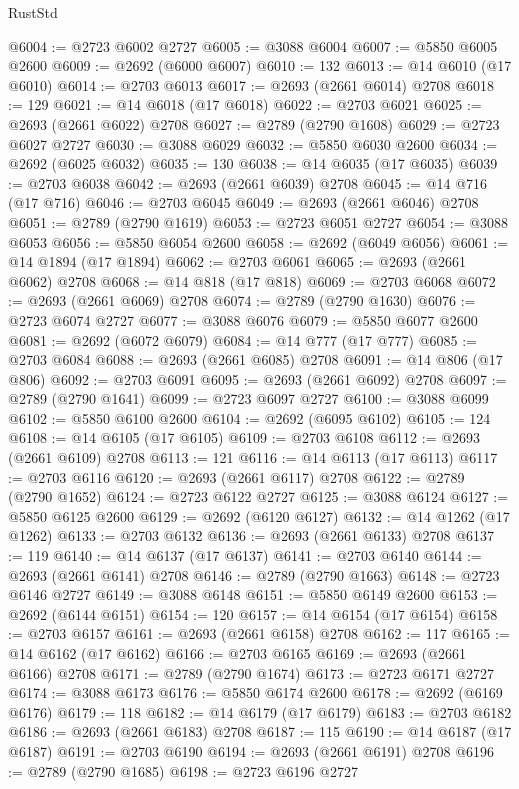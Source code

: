 \begin{lexlean}{RustStd}
\begin{coremodule}
@6004 := @2723 @6002 @2727
@6005 := @3088 @6004
@6007 := @5850 @6005 @2600
@6009 := @2692 (@6000 @6007)
@6010 := 132
@6013 := @14 @6010 (@17 @6010)
@6014 := @2703 @6013
@6017 := @2693 (@2661 @6014) @2708
@6018 := 129
@6021 := @14 @6018 (@17 @6018)
@6022 := @2703 @6021
@6025 := @2693 (@2661 @6022) @2708
@6027 := @2789 (@2790 @1608)
@6029 := @2723 @6027 @2727
@6030 := @3088 @6029
@6032 := @5850 @6030 @2600
@6034 := @2692 (@6025 @6032)
@6035 := 130
@6038 := @14 @6035 (@17 @6035)
@6039 := @2703 @6038
@6042 := @2693 (@2661 @6039) @2708
@6045 := @14 @716 (@17 @716)
@6046 := @2703 @6045
@6049 := @2693 (@2661 @6046) @2708
@6051 := @2789 (@2790 @1619)
@6053 := @2723 @6051 @2727
@6054 := @3088 @6053
@6056 := @5850 @6054 @2600
@6058 := @2692 (@6049 @6056)
@6061 := @14 @1894 (@17 @1894)
@6062 := @2703 @6061
@6065 := @2693 (@2661 @6062) @2708
@6068 := @14 @818 (@17 @818)
@6069 := @2703 @6068
@6072 := @2693 (@2661 @6069) @2708
@6074 := @2789 (@2790 @1630)
@6076 := @2723 @6074 @2727
@6077 := @3088 @6076
@6079 := @5850 @6077 @2600
@6081 := @2692 (@6072 @6079)
@6084 := @14 @777 (@17 @777)
@6085 := @2703 @6084
@6088 := @2693 (@2661 @6085) @2708
@6091 := @14 @806 (@17 @806)
@6092 := @2703 @6091
@6095 := @2693 (@2661 @6092) @2708
@6097 := @2789 (@2790 @1641)
@6099 := @2723 @6097 @2727
@6100 := @3088 @6099
@6102 := @5850 @6100 @2600
@6104 := @2692 (@6095 @6102)
@6105 := 124
@6108 := @14 @6105 (@17 @6105)
@6109 := @2703 @6108
@6112 := @2693 (@2661 @6109) @2708
@6113 := 121
@6116 := @14 @6113 (@17 @6113)
@6117 := @2703 @6116
@6120 := @2693 (@2661 @6117) @2708
@6122 := @2789 (@2790 @1652)
@6124 := @2723 @6122 @2727
@6125 := @3088 @6124
@6127 := @5850 @6125 @2600
@6129 := @2692 (@6120 @6127)
@6132 := @14 @1262 (@17 @1262)
@6133 := @2703 @6132
@6136 := @2693 (@2661 @6133) @2708
@6137 := 119
@6140 := @14 @6137 (@17 @6137)
@6141 := @2703 @6140
@6144 := @2693 (@2661 @6141) @2708
@6146 := @2789 (@2790 @1663)
@6148 := @2723 @6146 @2727
@6149 := @3088 @6148
@6151 := @5850 @6149 @2600
@6153 := @2692 (@6144 @6151)
@6154 := 120
@6157 := @14 @6154 (@17 @6154)
@6158 := @2703 @6157
@6161 := @2693 (@2661 @6158) @2708
@6162 := 117
@6165 := @14 @6162 (@17 @6162)
@6166 := @2703 @6165
@6169 := @2693 (@2661 @6166) @2708
@6171 := @2789 (@2790 @1674)
@6173 := @2723 @6171 @2727
@6174 := @3088 @6173
@6176 := @5850 @6174 @2600
@6178 := @2692 (@6169 @6176)
@6179 := 118
@6182 := @14 @6179 (@17 @6179)
@6183 := @2703 @6182
@6186 := @2693 (@2661 @6183) @2708
@6187 := 115
@6190 := @14 @6187 (@17 @6187)
@6191 := @2703 @6190
@6194 := @2693 (@2661 @6191) @2708
@6196 := @2789 (@2790 @1685)
@6198 := @2723 @6196 @2727

\end{coremodule}
\end{lexlean}
